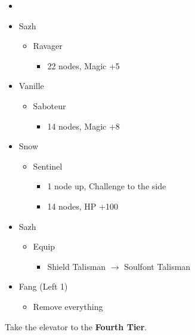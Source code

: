 \documentclass{report}
\begin{document}
\begin{menu}
\begin{itemize}
    \paradigm
    \begin{itemize}
        \item {}%
{\paradigmline{\textit{\syn}}{\textit{\sab}}{\textit{\rav}}}%
{\paradigmline{\com}{\med}{\com}}%
{\paradigmline{\syn}{\med}{\com}}%
{\paradigmline{\com}{\sab}{\com}}%
{\paradigmline{(\rav)}{\sab}{(\rav)}}%
{\paradigmline{\com}{\rav}{\com}}
    \end{itemize}
    \crystarium
    \begin{itemize}
        \item Sazh
        \begin{itemize}
            \item Ravager
            \begin{itemize}
                \item 22 nodes, Magic +5
            \end{itemize}
        \end{itemize}
        \item Vanille
        \begin{itemize}
            \item Saboteur
            \begin{itemize}
                \item 14 nodes, Magic +8
            \end{itemize}
        \end{itemize}
        \item Snow
        \begin{itemize}
            \item Sentinel
            \begin{itemize}
                \item 1 node up, Challenge to the side
                \item 14 nodes, HP +100
            \end{itemize}
        \end{itemize}
    \end{itemize}
    \equip
    \begin{itemize}
        \item Sazh
        \begin{itemize}
            \item Equip
            \begin{itemize}
                \item Shield Talisman $\rightarrow$ Soulfont Talisman
            \end{itemize}
        \end{itemize}
        \item Fang (Left 1)
        \begin{itemize}
            \item Remove everything
        \end{itemize}
    \end{itemize}
\end{itemize}
\end{menu}
Take the elevator to the \textbf{Fourth Tier}.
\end{document}
